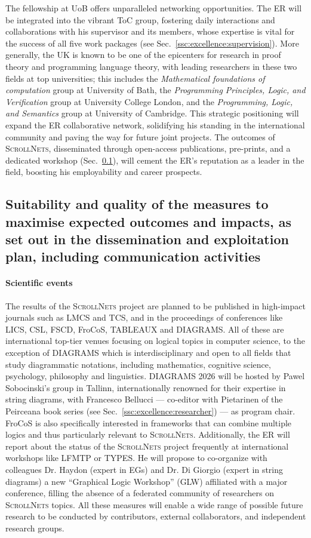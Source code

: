 \documentclass[11pt]{msca-pf}
\newcommand{\proj}{\small\textsc{ScrollNets}}
\begin{document}
The fellowship at UoB offers unparalleled networking opportunities. The ER will be integrated into
the vibrant ToC group, fostering daily interactions and collaborations with his supervisor and its
members, whose expertise is vital for the success of all five work packages (see
Sec.~\ref{ssc:excellence:supervision}). More generally, the UK is known to be one of the epicenters
for research in proof theory and programming language theory, with leading researchers in these two
fields at top universities; this includes the \emph{Mathematical foundations of computation} group
at University of Bath, the \emph{Programming Principles, Logic, and Verification} group at
University College London, and the \emph{Programming, Logic, and Semantics} group at University of
Cambridge. This strategic positioning will expand the ER collaborative network, solidifying his
standing in the international community and paving the way for future joint projects. The outcomes
of {\proj}, disseminated through open-access publications, pre-prints, and a dedicated workshop
(Sec.~\ref{ssc:impact:outcomes}), will cement the ER's reputation as a leader in the field, boosting
his employability and career prospects.

\subsection{Suitability and quality of the measures to maximise expected
    outcomes and impacts, as set out in the dissemination and exploitation plan,
    including communication activities }
\label{ssc:impact:outcomes}

\paragraph{Scientific events}
The results of the {\proj} project are planned to be published in high-impact journals such as LMCS
and TCS, and in the proceedings of conferences like LICS, CSL, FSCD, FroCoS, TABLEAUX and DIAGRAMS.
All of these are international top-tier venues focusing on logical topics in computer science, to
the exception of DIAGRAMS which is interdisciplinary and open to all fields that study diagrammatic
notations, including mathematics, cognitive science, psychology, philosophy and linguistics.
DIAGRAMS 2026 will be hosted by Pawel Sobocinski's group in Tallinn, internationally renowned for
their expertise in string diagrams, with Francesco Bellucci --- co-editor with Pietarinen of the
Peirceana book series (see Sec.~\ref{ssc:excellence:researcher}) --- as program chair. FroCoS is
also specifically interested in frameworks that can combine multiple logics and thus particularly
relevant to {\proj}. Additionally, the ER will report about the status of the {\proj} project
frequently at international workshops like LFMTP or TYPES. He will propose to co-organize with
colleagues Dr. Haydon (expert in EGs) and Dr. Di Giorgio (expert in string diagrams) a new
``Graphical Logic Workshop'' (GLW) affiliated with a major conference, filling the absence of a
federated community of researchers on {\proj} topics. All these measures will enable a wide range of
possible future research to be conducted by contributors, external collaborators, and independent
research groups.
\end{document}
